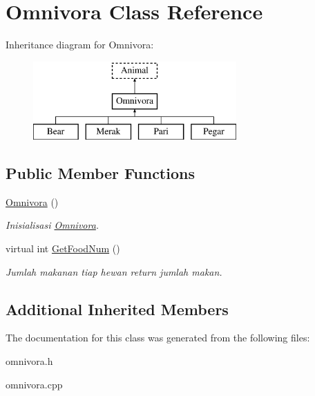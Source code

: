 \hypertarget{class_omnivora}{}\section{Omnivora Class Reference}
\label{class_omnivora}
Inheritance diagram for Omnivora\+:\begin{figure}[H]
\begin{center}
\leavevmode
\includegraphics[height=3.000000cm]{class_omnivora}
\end{center}
\end{figure}
\subsection*{Public Member Functions}
\begin{DoxyCompactItemize}
\item 
\hyperlink{class_omnivora_a5073dcd66e4ebe988dffbafd2bb9b745}{Omnivora} ()\hypertarget{class_omnivora_a5073dcd66e4ebe988dffbafd2bb9b745}{}\label{class_omnivora_a5073dcd66e4ebe988dffbafd2bb9b745}

\begin{DoxyCompactList}\small\item\em Inisialisasi \hyperlink{class_omnivora}{Omnivora}. \end{DoxyCompactList}\item 
virtual int \hyperlink{class_omnivora_af78063c104f28eb8662387c45abdc717}{Get\+Food\+Num} ()\hypertarget{class_omnivora_af78063c104f28eb8662387c45abdc717}{}\label{class_omnivora_af78063c104f28eb8662387c45abdc717}

\begin{DoxyCompactList}\small\item\em Jumlah makanan tiap hewan return jumlah makan. \end{DoxyCompactList}\end{DoxyCompactItemize}
\subsection*{Additional Inherited Members}


The documentation for this class was generated from the following files\+:\begin{DoxyCompactItemize}
\item 
omnivora.\+h\item 
omnivora.\+cpp\end{DoxyCompactItemize}
